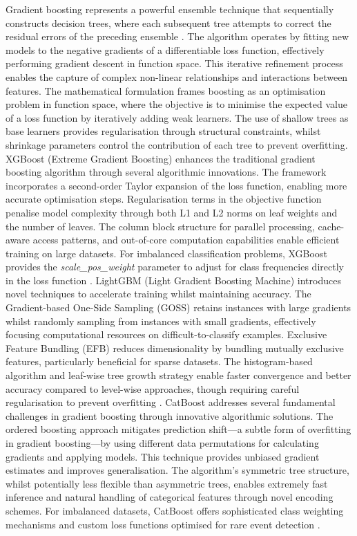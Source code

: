 \documentclass[nhess, manuscript]{copernicus}
\begin{document}
Gradient boosting represents a powerful ensemble technique that sequentially constructs decision trees, where each subsequent tree attempts to correct the residual errors of the preceding ensemble \citep{Bentejac_2021}. The algorithm operates by fitting new models to the negative gradients of a differentiable loss function, effectively performing gradient descent in function space. This iterative refinement process enables the capture of complex non-linear relationships and interactions between features. The mathematical formulation frames boosting as an optimisation problem in function space, where the objective is to minimise the expected value of a loss function by iteratively adding weak learners. The use of shallow trees as base learners provides regularisation through structural constraints, whilst shrinkage parameters control the contribution of each tree to prevent overfitting. XGBoost (Extreme Gradient Boosting) enhances the traditional gradient boosting algorithm through several algorithmic innovations. The framework incorporates a second-order Taylor expansion of the loss function, enabling more accurate optimisation steps. Regularisation terms in the objective function penalise model complexity through both L1 and L2 norms on leaf weights and the number of leaves. The column block structure for parallel processing, cache-aware access patterns, and out-of-core computation capabilities enable efficient training on large datasets. For imbalanced classification problems, XGBoost provides the \textit{scale\_pos\_weight} parameter to adjust for class frequencies directly in the loss function \citep{Chen_2016}. LightGBM (Light Gradient Boosting Machine) introduces novel techniques to accelerate training whilst maintaining accuracy. The Gradient-based One-Side Sampling (GOSS) retains instances with large gradients whilst randomly sampling from instances with small gradients, effectively focusing computational resources on difficult-to-classify examples. Exclusive Feature Bundling (EFB) reduces dimensionality by bundling mutually exclusive features, particularly beneficial for sparse datasets. The histogram-based algorithm and leaf-wise tree growth strategy enable faster convergence and better accuracy compared to level-wise approaches, though requiring careful regularisation to prevent overfitting \citep{Ke_2017}. CatBoost addresses several fundamental challenges in gradient boosting through innovative algorithmic solutions. The ordered boosting approach mitigates prediction shift—a subtle form of overfitting in gradient boosting—by using different data permutations for calculating gradients and applying models. This technique provides unbiased gradient estimates and improves generalisation. The algorithm's symmetric tree structure, whilst potentially less flexible than asymmetric trees, enables extremely fast inference and natural handling of categorical features through novel encoding schemes. For imbalanced datasets, CatBoost offers sophisticated class weighting mechanisms and custom loss functions optimised for rare event detection \citep{Prokhorenkova_2018}.
\end{document}
